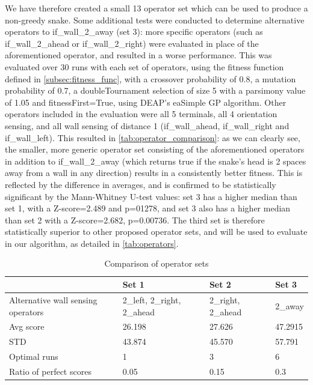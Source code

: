\documentclass[british,10pt,a4paper]{article}
\begin{document}
We have therefore created a small 13 operator set which can be used to produce a non-greedy snake. \newline
Some additional tests were conducted to determine alternative operators to if\_wall\_2\_away (set 3): more specific operators (such as if\_wall\_2\_ahead or if\_wall\_2\_right) were evaluated in place of the aforementioned operator, and resulted in a worse performance. This was evaluated over 30 runs with each set of operators, using the fitness function defined in \autoref{subsec:fitness_func}, with a crossover probability of 0.8, a mutation probability of 0.7, a doubleTournament selection of size 5 with a parsimony value of 1.05 and fitnessFirst=True, using DEAP's eaSimple GP algorithm. Other operators included in the evaluation were all 5 terminals, all 4 orientation sensing, and all wall sensing of distance 1 (if\_wall\_ahead, if\_wall\_right and if\_wall\_left). \newline
This resulted in \autoref{tab:operator_comparison}: as we can clearly see, the smaller, more generic operator set consisting of the aforementioned operators in addition to if\_wall\_2\_away (which returns true if the snake's head is 2 spaces away from a wall in any direction) results in a consistently better fitness. This is reflected by the difference in averages, and is confirmed to be statistically significant by the Mann-Whitney U-test values: set 3 has a higher median than set 1, with a Z-score=2.489 and p=01278, and set 3 also has a higher median than set 2 with a Z-score=2.682, p=0.00736. The third set is therefore statistically superior to other proposed operator sets, and will be used to evaluate in our algorithm, as detailed in \autoref{tab:operators}.

\begin{table}
\centering

\begin{tabular}{|l|l|l|l|}
\hline
 & Set 1 & Set 2 & Set 3 \\ \hline
Alternative wall sensing operators & 2\_left, 2\_right, 2\_ahead & 2\_right, 2\_ahead & 2\_away \\ \hline
Avg score & 26.198 & 27.626 & 47.2915 \\ \hline
STD & 43.874 & 45.570 & 57.791 \\ \hline
Optimal runs & 1 & 3 & 6 \\ \hline
Ratio of perfect scores & 0.05 & 0.15 & 0.3 \\ \hline
\end{tabular}
\caption{Comparison of operator sets}
\label{tab:operator_comparison}
\end{table}
\end{document}
